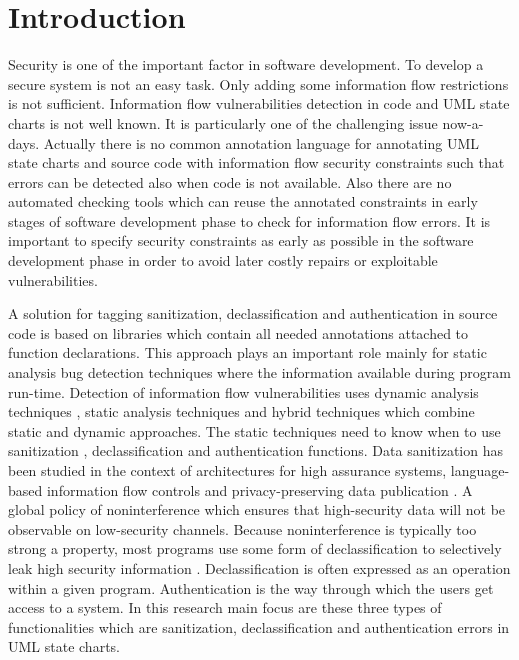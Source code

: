 \chapter{Introduction}
\label{chapter:Introduction}
Security is one of the important factor in software development. To develop a secure system is not an easy task. Only adding some information flow restrictions is not sufficient. Information flow vulnerabilities detection in code and UML state charts is not well known. It is particularly one of the challenging issue now-a-days. Actually there is no common annotation language for annotating UML state charts and source code with
information flow security constraints such that errors can be detected also when code is not available. Also there are
no automated checking tools which can reuse the annotated constraints in early stages of software development phase to check
for information flow errors. It is important to specify security constraints as early as possible in the software
development phase in order to avoid later costly repairs or exploitable vulnerabilities.

A solution for tagging sanitization, declassification and authentication in source code is based on libraries which contain all needed annotations attached to function declarations. This approach plays an important role mainly for static analysis bug detection techniques where the information available during program run-time. Detection of information flow vulnerabilities uses dynamic analysis techniques , static analysis techniques and hybrid techniques which combine static and dynamic approaches. The static techniques need to know when to use  sanitization , declassification and authentication functions. Data sanitization has been studied in the context of architectures for high assurance systems, language-based information flow controls and privacy-preserving data publication \cite{ref_1_gehani2011f}. A global policy of noninterference which ensures that high-security data will not be observable on low-security channels. Because noninterference is typically
too strong a property, most programs use some form of declassification to selectively leak high security  information \cite{ref_2_hicks2006trusted}. Declassification is often expressed as an operation within a given
program. Authentication is the way through which the users get access to a system. In this research main focus are these three types of functionalities which are sanitization, declassification and authentication errors in UML state charts. 

